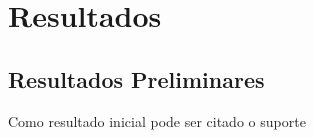 \chapter{Resultados}

\section{Resultados Preliminares}
Como resultado inicial pode ser citado o suporte 

